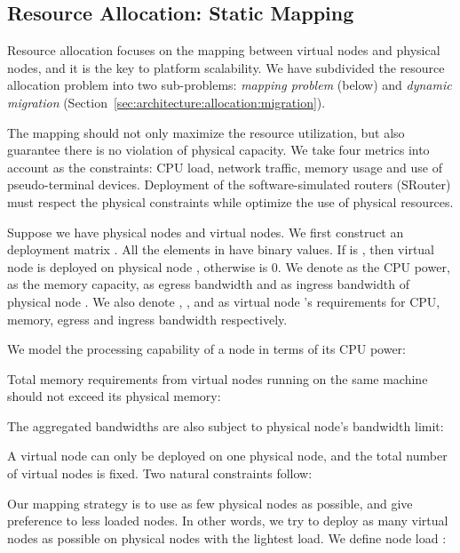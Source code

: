 \documentclass[conference]{IEEEtran}
\begin{document}
\subsection{Resource Allocation: Static Mapping}
\label{sec:architecture:allocation:mapping}

Resource allocation focuses on the mapping between virtual nodes and
physical nodes, and it is the key to platform scalability.
We have subdivided the resource allocation problem into two
sub-problems: \textit{mapping problem} (below) and \textit{dynamic
  migration} (Section~\ref{sec:architecture:allocation:migration}).

The mapping should not only maximize the resource utilization, but
also guarantee there is no violation of physical capacity. We take
four metrics into account as the constraints: CPU load, network
traffic, memory usage and use of pseudo-terminal devices.  Deployment
of the software-simulated routers (SRouter) must respect the physical
constraints while optimize the use of physical resources.


Suppose we have  physical nodes and  virtual nodes.  We first
construct an  deployment matrix . All the elements in
 have binary values.
If  is , then virtual node  is deployed on physical
node , otherwise  is 0. We denote  as the CPU power,
 as the memory capacity,  as egress bandwidth and  as
ingress bandwidth of physical node . We also denote , ,
 and  as virtual node 's requirements for CPU, memory,
egress and ingress bandwidth respectively.




We model the processing capability of a node in terms of its CPU
power:



Total memory requirements from virtual nodes running on the same
machine should not exceed its physical memory:



The aggregated bandwidths are also subject to physical node's
bandwidth limit:





A virtual node can only be deployed on one physical node, and the
total number of virtual nodes is fixed. Two natural constraints
follow:





Our mapping strategy is to use as few physical nodes as possible, and
give preference to less loaded nodes. In other words, we try to deploy
as many virtual nodes as possible on physical nodes with the lightest
load. We define node load :
\end{document}
